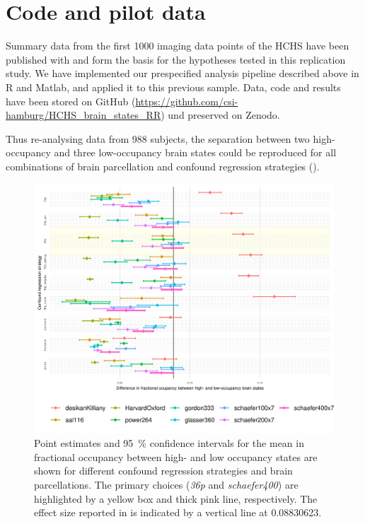\section{Code and pilot data}
Summary data from the first \num{1000} imaging data points of the HCHS have been published with \citep{Schlemm2022-he}  and form the basis for the hypotheses tested in this replication study.
We have implemented our prespecified analysis pipeline described above in R and Matlab, and applied it to this previous sample.
Data, code and results have been stored on GitHub (\url{https://github.com/csi-hamburg/HCHS_brain_states_RR}) und preserved on Zenodo.

Thus re-analysing data from \num{988} subjects, the separation between two high-occupancy and three low-occupancy brain states could be reproduced for all combinations of brain parcellation and confound regression strategies ().

\begin{figure}
    \includegraphics[width=\linewidth]{./../analysis/code/R/pipeline_files/figure-html/highVSlowFOplot-1.png}
    \caption{Point estimates and \qty{95}{\percent} confidence intervals for the mean in fractional occupancy between high- and low occupancy states are shown for different confound regression strategies and brain parcellations. The primary choices (\textit{36p} and \textit{schaefer400}) are highlighted by a yellow box and thick pink line, respectively. The effect size reported in \citep{Schlemm2022-he} is indicated by a vertical line at 0.08830623.}
    \label{fig:separation}
\end{figure}

